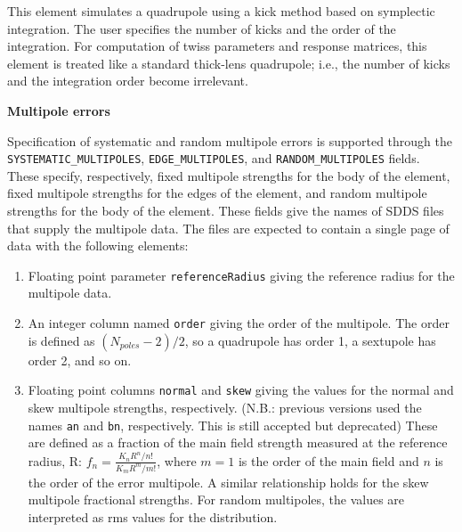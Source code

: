 This element simulates a quadrupole using a kick method based on
symplectic integration.  The user specifies the number of kicks and
the order of the integration.  For computation of twiss parameters and
response matrices, this element is treated like a standard thick-lens
quadrupole; i.e., the number of kicks and the integration order become
irrelevant.

{\bf Multipole errors}

\begin{raggedright}
Specification of systematic and random multipole errors is supported
through the \verb|SYSTEMATIC_MULTIPOLES|, \verb|EDGE_MULTIPOLES|, and 
\verb|RANDOM_MULTIPOLES|
fields.  These specify, respectively, fixed multipole strengths for the
body of the element, fixed multipole strengths for the edges of the element,
and random multipole strengths for the body of the element.
These fields give the names of SDDS files that supply the
multipole data.  The files are expected to contain a single page of
data with the following elements:
\end{raggedright}
\begin{enumerate}
\item Floating point parameter {\tt referenceRadius} giving the reference
 radius for the multipole data.
\item An integer column named {\tt order} giving the order of the multipole.
The order is defined as $(N_{poles}-2)/2$, so a quadrupole has order 1, a
sextupole has order 2, and so on.
\item Floating point columns {\tt normal} and {\tt skew} giving the values for the
normal and skew multipole strengths, respectively.  
(N.B.: previous versions used the names {\tt an} and {\tt bn}, respectively. This is still accepted but deprecated)
These are defined as a fraction 
of the main field strength measured at the reference radius, R: 
$f_n  = \frac{K_n R^n / n!}{K_m R^m / m!}$, where 
$m=1$ is the order of the main field and $n$ is the order of the error multipole.
A similar relationship holds for the skew multipole fractional strengths.
For random multipoles, the values are interpreted as rms values for the distribution.
\end{enumerate}

